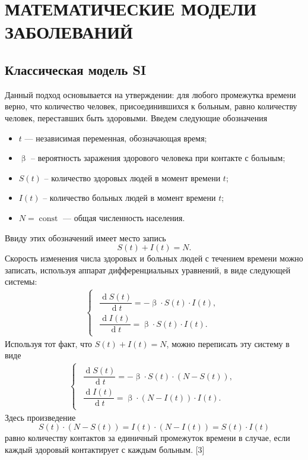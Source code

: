 \documentclass[a4paper, 12pt]{extarticle}
\numberwithin{equation}{section}
\renewcommand{\beta}{\upbeta}
\renewcommand{\d}{\operatorname{d}}
\begin{document}
	\section{МАТЕМАТИЧЕСКИЕ МОДЕЛИ ЗАБОЛЕВАНИЙ}
	\subsection{Классическая модель SI}
	Данный подход основывается на утверждении: для любого промежутка времени верно, что количество человек, присоединившихся к больным, равно количеству человек, переставших быть здоровыми. Введем следующие обозначения
	\begin{itemize}
		\item $t$ --- независимая переменная, обозначающая время;
		\item $\beta$ -- вероятность заражения здорового человека при контакте с больным;
		\item $S(t)$ -- количество здоровых людей в момент времени $t$; 
		\item $I(t)$ -- количество больных людей в момент времени $t$;
		\item $N = \operatorname{const}$ --- общая численность населения.
	\end{itemize}
	Ввиду этих обозначений имеет место запись $$S(t) + I(t) = N.$$
	Скорость изменения числа здоровых и больных людей с течением времени можно записать, используя аппарат дифференциальных уравнений, в виде следующей системы:
	\begin{eqnarray}
		\left\{ 
		\begin{gathered} 
			\begin{aligned}
				\dfrac{\d S(t)}{\d t} = -\beta\cdot S(t)\cdot I(t),\\
				\dfrac{\d I(t)}{\d t} = \beta\cdot S(t)\cdot I(t).
			\end{aligned}
		\end{gathered} 
		\right.
	\end{eqnarray}
	Используя тот факт, что $S(t) + I(t) = N$, можно переписать эту систему в виде
	\begin{eqnarray}
		\left\{ 
		\begin{gathered} 
			\begin{aligned}
		\dfrac{\d S(t)}{\d t} = -\beta \cdot S(t)\cdot (N - S(t)),\\
		\dfrac{\d I(t)}{\d t} = \beta\cdot (N - I(t))\cdot I(t).
			\end{aligned}
		\end{gathered} 
		\right.
	\end{eqnarray}
	Здесь произведение 
	$$S(t) \cdot (N - S(t)) = I(t)\cdot (N - I(t)) = S(t)\cdot I(t)$$
	равно количеству контактов за единичный промежуток времени в случае, если каждый здоровый контактирует с каждым больным. [3]
	
\end{document}
